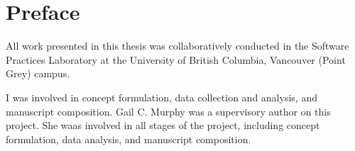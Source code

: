 
\chapter{Preface}

All work presented in this thesis was collaboratively conducted in the
Software Practices Laboratory at the University of British Columbia,
Vancouver (Point Grey) campus.

\par I was involved in concept formulation, 
data collection and analysis, and
manuscript composition.
Gail C. Murphy was a supervisory author on this project.
She waas involved in all stages of the project, including
concept formulation,
data analysis, and
manuscript composition.

\endinput

TODO: revisit this after collaborating with JetBrains.
